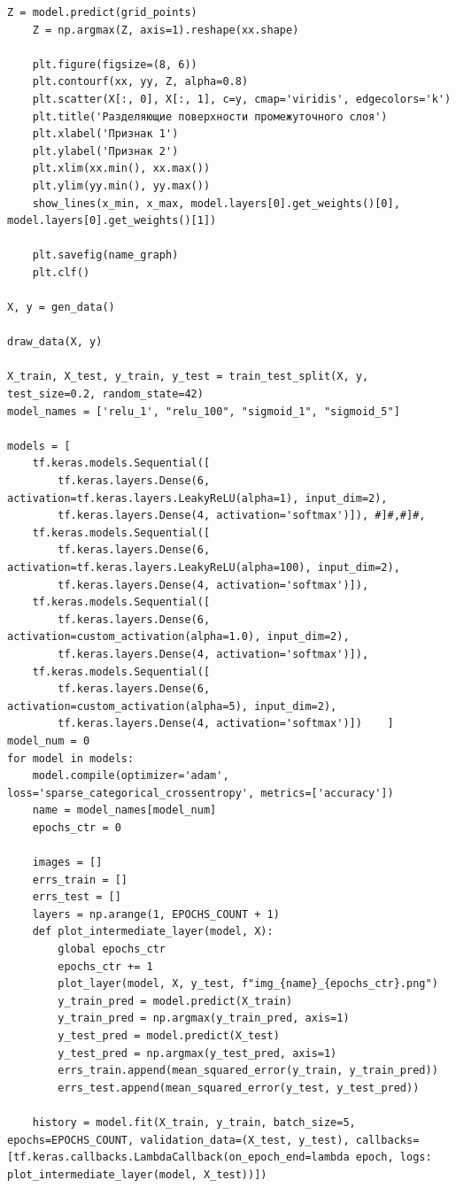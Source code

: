 \documentclass[12pt]{report}
\begin{document}
\begin{lstlisting}[label=lst:gen1,caption=Код классификации]
    Z = model.predict(grid_points)
    Z = np.argmax(Z, axis=1).reshape(xx.shape)

    plt.figure(figsize=(8, 6))
    plt.contourf(xx, yy, Z, alpha=0.8)
    plt.scatter(X[:, 0], X[:, 1], c=y, cmap='viridis', edgecolors='k')
    plt.title('Разделяющие поверхности промежуточного слоя')
    plt.xlabel('Признак 1')
    plt.ylabel('Признак 2')
    plt.xlim(xx.min(), xx.max())
    plt.ylim(yy.min(), yy.max())
    show_lines(x_min, x_max, model.layers[0].get_weights()[0], model.layers[0].get_weights()[1])

    plt.savefig(name_graph)
    plt.clf()
    
X, y = gen_data()

draw_data(X, y)

X_train, X_test, y_train, y_test = train_test_split(X, y, test_size=0.2, random_state=42)
model_names = ['relu_1', "relu_100", "sigmoid_1", "sigmoid_5"]

models = [
    tf.keras.models.Sequential([
        tf.keras.layers.Dense(6, activation=tf.keras.layers.LeakyReLU(alpha=1), input_dim=2),
        tf.keras.layers.Dense(4, activation='softmax')]), #]#,#]#,
    tf.keras.models.Sequential([
        tf.keras.layers.Dense(6, activation=tf.keras.layers.LeakyReLU(alpha=100), input_dim=2),
        tf.keras.layers.Dense(4, activation='softmax')]),
    tf.keras.models.Sequential([
        tf.keras.layers.Dense(6, activation=custom_activation(alpha=1.0), input_dim=2),
        tf.keras.layers.Dense(4, activation='softmax')]),
    tf.keras.models.Sequential([
        tf.keras.layers.Dense(6, activation=custom_activation(alpha=5), input_dim=2),
        tf.keras.layers.Dense(4, activation='softmax')])    ]
model_num = 0
for model in models:
    model.compile(optimizer='adam', loss='sparse_categorical_crossentropy', metrics=['accuracy'])
    name = model_names[model_num]
    epochs_ctr = 0

    images = []
    errs_train = []
    errs_test = []
    layers = np.arange(1, EPOCHS_COUNT + 1)
    def plot_intermediate_layer(model, X):
        global epochs_ctr
        epochs_ctr += 1
        plot_layer(model, X, y_test, f"img_{name}_{epochs_ctr}.png")
        y_train_pred = model.predict(X_train)
        y_train_pred = np.argmax(y_train_pred, axis=1)
        y_test_pred = model.predict(X_test)
        y_test_pred = np.argmax(y_test_pred, axis=1)
        errs_train.append(mean_squared_error(y_train, y_train_pred))
        errs_test.append(mean_squared_error(y_test, y_test_pred))

    history = model.fit(X_train, y_train, batch_size=5, epochs=EPOCHS_COUNT, validation_data=(X_test, y_test), callbacks=[tf.keras.callbacks.LambdaCallback(on_epoch_end=lambda epoch, logs: plot_intermediate_layer(model, X_test))])


\end{lstlisting}
\end{document}
